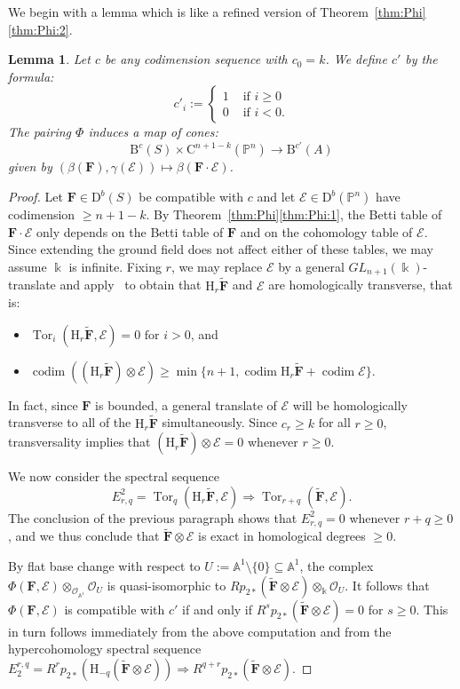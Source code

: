 \documentclass[12pt]{amsart}
\newtheorem{lemma}{Lemma}[section]
\theoremstyle{definition}
\theoremstyle{remark}
\newcommand{\Tor}{\operatorname{Tor}}
\newcommand{\kk}{\Bbbk}
\newcommand{\codim}{\operatorname{codim}}
\newcommand{\PP}{\mathbb{P}}
\renewcommand{\AA}{\mathbb{A}}
\newcommand{\HH}{\mathrm{H}}
\newcommand{\cc}{c}
\newcommand{\cO}{\mathcal{O}}
\newcommand{\cE}{\mathcal{E}}
\newcommand{\FF}{\mathbf{F}}
\newcommand{\GL}{{GL}}
\newcommand{\DD}{\mathrm{D}}
\newcommand{\CQ}{\mathrm{C}}
\newcommand{\BBQ}{\mathrm{B}}
\begin{document}
We begin with a lemma which is like a refined version of Theorem~\ref{thm:Phi}\eqref{thm:Phi:2}.  

\begin{lemma}\label{lem:refined positivity}
Let $\cc$ be any codimension sequence with $\cc_0=k$.   We define $\cc'$ by the formula:
\[
\cc'_i:=\begin{cases}
1&\text{ if } i\geq 0\\%
0&\text{ if } i<0. %
\end{cases}
\]
The  pairing $\Phi$ induces a map of cones:
\[
\BBQ^{\cc}(S)\times \CQ^{n+1-k}(\PP^n)\to \BBQ^{\cc'}(A)
\]
given by $(\beta(\FF), \gamma(\cE))\mapsto \beta(\FF\cdot \cE)$.
\end{lemma}
\begin{proof}
Let $\FF\in \DD^b(S)$ be compatible with $\cc$ and let $\cE\in \DD^{b}(\PP^n)$ have codimension $\geq n+1-k$.  By Theorem~\ref{thm:Phi}\eqref{thm:Phi:1}, the Betti table of $\FF\cdot \cE$ only depends on the Betti table of $\FF$ and on the cohomology table of $\cE$.  Since extending the ground field does not affect either of these tables, we may assume $\kk$ is infinite.  Fixing $r$, we may replace $\cE$ by a general $\GL_{n+1}(\kk)$-translate and apply~\cite[Theorem, p.\ 335]{miller-speyer} to obtain that $\HH_r \widetilde{\FF}$ and $\cE$ are homologically transverse, that is:
\begin{itemize}
	\item $\Tor_i(\HH_r\widetilde{\FF},\cE)=0 \text{ for } i>0$, and
	\item $\codim ((\HH_r\widetilde{\FF})\otimes \cE) \geq \min\{n+1, \codim \HH_r\widetilde{\FF}+\codim \cE\}.$
\end{itemize}
In fact, since $\FF$ is bounded, a general translate of $\cE$ will be homologically transverse to all of the $\HH_r\widetilde{\FF}$ simultaneously.  
Since $c_r\geq k$ for all $r\geq 0$, transversality implies that $(\HH_r\widetilde{\FF})\otimes \cE=0$ whenever $r\geq 0$.


We now consider the spectral sequence
\[
E^2_{r,q}=\Tor_q(\HH_r\widetilde{\FF},\cE)\Rightarrow \Tor_{r+q}(\widetilde{\FF},\cE).
\]
The conclusion of the previous paragraph shows that $E^2_{r,q}=0$ whenever $r+q\geq 0$, and we thus conclude that 
$\widetilde{\FF}\otimes \cE$ is exact in homological degrees $\geq 0$.

By flat base change with respect to $U:=\AA^1\setminus \{0\} \subseteq \AA^1$, the complex $\Phi(\FF,\cE)\otimes_{\cO_{\AA^1}} \cO_{U}$ is quasi-isomorphic to $Rp_{2*}(\widetilde{\FF}\otimes \cE)\otimes_{\kk} \cO_{U}$.  It follows that $\Phi(\FF,\cE)$ is compatible with $\cc'$ if and only if $R^sp_{2*}(\widetilde{\FF}\otimes \cE)=0$ for $s\geq 0$.  This in turn follows immediately from the above computation and from the hypercohomology spectral sequence
$
E_2^{r,q}=R^{r}p_{2*}(\HH_{-q}(\widetilde{\FF}\otimes \cE))\Rightarrow R^{q+r}p_{2*}(\widetilde{\FF}\otimes \cE).
$
\end{proof}
\end{document}
